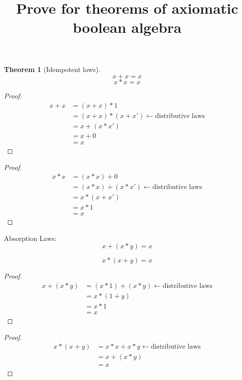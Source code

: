 \documentclass{article}
\newtheorem{theorem}{Theorem}[section]
\begin{document}
\title{Prove for theorems of axiomatic boolean algebra}

\begin{theorem}[Idempotent laws]
\label{idempotent}
\[ x + x = x \]
\[ x * x = x \]
\end{theorem}

\begin{proof}
\begin{align*}
x + x & = (x + x) * 1 \\
      & = (x + x) * (x + x') \longleftarrow \text{distributive laws} \\
      & = x + (x * x') \\
      & = x + 0 \\
      & = x
\end{align*}
\end{proof}

\begin{proof}
\begin{align*}
x * x & = (x * x) + 0 \\
      & = (x * x) + (x * x') \longleftarrow \text{distributive laws} \\
      & = x * (x + x') \\
      & = x * 1 \\
      & = x
\end{align*}
\end{proof}

Absorption Laws:
\begin{equation}
x + (x * y) = x
\end{equation}

\begin{equation}
x * (x + y) = x
\end{equation}

\begin{proof}
\begin{align*}
x + (x * y) & = (x * 1) + (x * y)  \longleftarrow \text{distributive laws} \\
            & = x * (1 + y) \\
            & = x * 1 \\
            & = x
\end{align*}
\end{proof}

\begin{proof}
\begin{align*}
x * (x + y) & = x * x + x * y \longleftarrow \text{distributive laws} \\
            & = x + (x * y) \\
            & = x
\end{align*}
\end{proof}
\end{document}
